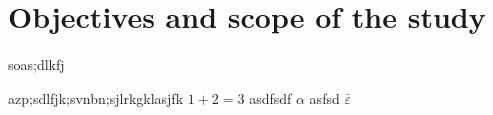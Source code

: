 \section{Objectives and scope of the study}\label{ch:intro:se:obj}

soas;dlkfj

azp;sdlfjk;svnbn;sjlrkgklasjfk $ 1+2=3 $ asdfsdf $\alpha$ asfsd $\bar{\varepsilon}$
